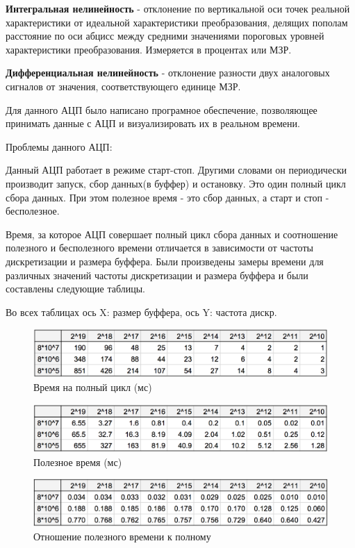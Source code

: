 \documentclass[../paper.tex]{subfiles}
\begin{document}
\textbf{Интегральная нелинейность} - отклонение по вертикальной оси точек реальной характеристики от идеальной характеристики преобразования, делящих пополам расстояние по оси абцисс между средними значениями пороговых уровней характеристики преобразования. Измеряется в процентах или  МЗР.

\textbf{Дифференциальная нелинейность} - отклонение разности двух аналоговых сигналов от значения, соответствующего единице МЗР.

Для данного АЦП было написано програмное обеспечение, позволяющее принимать данные с АЦП и визуализировать их в реальном времени.

Проблемы данного АЦП:

Данный АЦП работает в режиме старт-стоп. Другими словами он периодически производит запуск, сбор данных(в буффер) и остановку. Это один полный цикл сбора данных. При этом полезное время - это сбор данных, а старт и стоп - бесполезное.

Время, за которое АЦП совершает полный цикл сбора данных и соотношение полезного и бесполезного времени отличается в зависимости от частоты дискретизации и размера буффера. Были произведены замеры времени для различных значений частоты дискретизации и размера буффера и были составлены следующие таблицы.

Во всех таблицах ось X: размер буффера, ось Y: частота дискр.

\begin{figure}[H]
\centering
\includegraphics[width=\textwidth]{images/cycle-time.png}
\caption{Время на полный цикл (мс)}
\end{figure}

\begin{figure}[H]
\centering
\includegraphics[width=\textwidth]{images/good-time.png}
\caption{Полезное время (мс)}
\end{figure}

\begin{figure}[H]
\centering
\includegraphics[width=\textwidth]{images/bad-div-by-good.png}
\caption{Отношение полезного времени к полному}
\end{figure}
\end{document}

